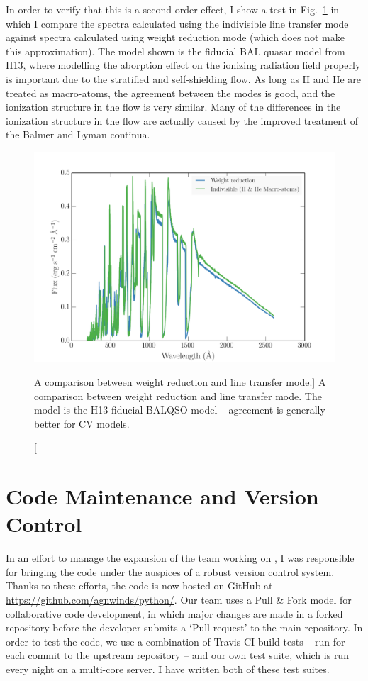 In order to verify that this is a second order effect, 
I show a test in Fig.~\ref{fig:line_transfer} in which I compare the spectra calculated
using the indivisible 
line transfer mode against spectra calculated
using weight reduction mode (which does not make this 
approximation). The model shown is the fiducial BAL quasar model from
H13, where modelling the aborption effect on the ionizing radiation field 
properly is important due to the stratified
and self-shielding flow. As long as H and He are treated as macro-atoms, the agreement
between the modes is good, and the ionization structure in the flow is very similar.
Many of the differences in the ionization structure in the flow are actually
caused by the improved treatment of the Balmer and Lyman continua.

\begin{figure}
\centering
\includegraphics[width=1.0\textwidth]{figures/03-radtrans/line_transfer_comparison.png}
\caption
[A comparison between weight reduction and line transfer mode.]
{
A comparison between weight reduction and line transfer mode. 
The model is the H13 fiducial BALQSO model -- agreement is generally
better for CV models. 
} 
\label{fig:line_transfer}
\end{figure}

\section{Code Maintenance and Version Control}
\label{sec:code_maintenance}

In an effort to manage the expansion of the team working on \py, I was responsible
for bringing the code under the auspices of a robust version control system.
Thanks to these efforts, the code is now hosted on GitHub at 
\url{https://github.com/agnwinds/python/}. Our team uses a Pull \& Fork model
for collaborative code development, in which major changes are made in a 
forked repository before the developer submits a `Pull request' to the main 
repository. In order to test the code, we use a combination of Travis CI build tests 
-- run for each commit to the upstream repository -- and our own test suite, which is 
run every night on a multi-core server. I have written both of these test suites.

